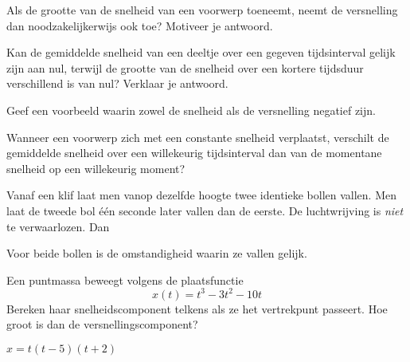 \documentclass{ximera}
\begin{document}
	\author{Bart Lambregs}
    \xmsource\xmuitleg

\begin{exercise}
	Als de grootte van de snelheid van een voorwerp toeneemt, neemt de versnelling dan noodzakelijkerwijs ook toe? Motiveer je antwoord.
\end{exercise}

\begin{exercise}
	Kan de gemiddelde snelheid van een deeltje over een gegeven tijdsinterval gelijk zijn aan nul, terwijl de grootte van de snelheid over een kortere tijdsduur verschillend is van nul? Verklaar je antwoord.
\end{exercise}

\begin{exercise}
	Geef een voorbeeld waarin zowel de snelheid als de versnelling negatief zijn.
\end{exercise}

\begin{exercise}
	Wanneer een voorwerp zich met een constante snelheid verplaatst, verschilt de gemiddelde snelheid over een willekeurig tijdsinterval dan van de momentane snelheid op een willekeurig moment?
\end{exercise}

\begin{exercise}
	Vanaf een klif laat men vanop dezelfde hoogte twee identieke bollen vallen. Men laat de tweede bol \'e\'en seconde later vallen dan de eerste. De luchtwrijving is \textit{niet} te verwaarlozen. Dan
	\begin{multipleChoice}
	\end{multipleChoice}
	\begin{oplossing}
		Voor beide bollen is de omstandigheid waarin ze vallen gelijk.
	\end{oplossing}
\end{exercise}

\begin{exercise}
	Een puntmassa beweegt volgens de plaatsfunctie
	\[
	x(t)=t^3-3t^2-10t
	\]
	Bereken haar snelheidscomponent telkens als ze het vertrekpunt passeert. Hoe groot is dan de versnellingscomponent?
	\begin{oplossing}
		$x=t(t-5)(t+2)$
	\end{oplossing}
\end{exercise}
\end{document}
